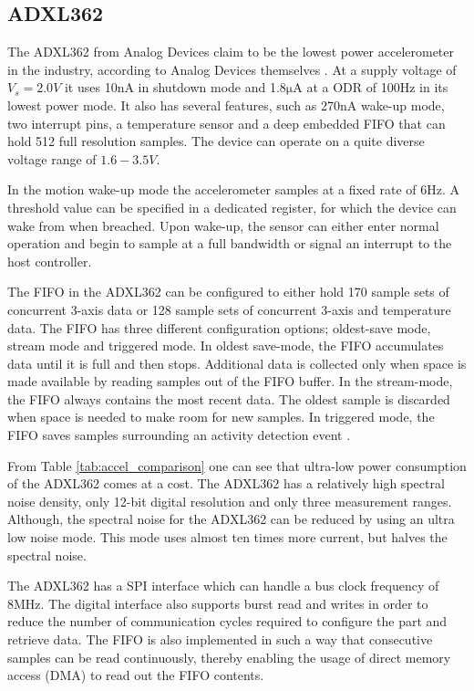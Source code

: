 \subsection{ADXL362}

The ADXL362 from Analog Devices claim to be the lowest power accelerometer in the industry, according to Analog Devices themselves \cite{analog12}. At a supply voltage of $V_s = 2.0 V$ it uses 10nA in shutdown mode and 1.8$\si{\micro\ampere}$ at a ODR of 100Hz in its lowest power mode. It also has several features, such as 270nA wake-up mode, two interrupt pins, a temperature sensor and a deep embedded FIFO that can hold 512 full resolution samples. The device can operate on a quite diverse voltage range of $1.6-3.5V$.

In the motion wake-up mode the accelerometer samples at a fixed rate of 6Hz. A threshold value can be specified in a dedicated register, for which the device can wake from when breached. Upon wake-up, the sensor can either enter normal operation and begin to sample at a full bandwidth or signal an interrupt to the host controller.

The FIFO in the ADXL362 can be configured to either hold 170 sample sets of concurrent 3-axis data or 128 sample sets of concurrent 3-axis and temperature data. The FIFO has three different configuration options; oldest-save mode, stream mode and triggered mode. In oldest save-mode, the  FIFO accumulates data until it is full and then stops. Additional data is collected only when space is made available by reading samples out of the FIFO buffer. In the stream-mode, the FIFO always contains the most recent data. The oldest sample is discarded when space is needed to make room for new samples. In triggered mode, the FIFO saves samples surrounding an activity detection event \cite[p~38]{ADXL362}.

From Table \ref{tab:accel_comparison} one can see that ultra-low power consumption of the ADXL362 comes at a cost. The ADXL362 has a relatively high spectral noise density, only 12-bit digital resolution and only three measurement ranges. Although, the spectral noise for the ADXL362 can be reduced by using an ultra low noise mode. This mode uses almost ten times more current, but halves the spectral noise.

The ADXL362 has a SPI interface which can handle a bus clock frequency of 8MHz. The digital interface also supports burst read and writes in order to reduce the number of communication cycles required to configure the part and retrieve data. The FIFO is also implemented in such a way that consecutive samples can be read continuously, thereby enabling the usage of direct memory access (DMA) to read out the FIFO contents.

